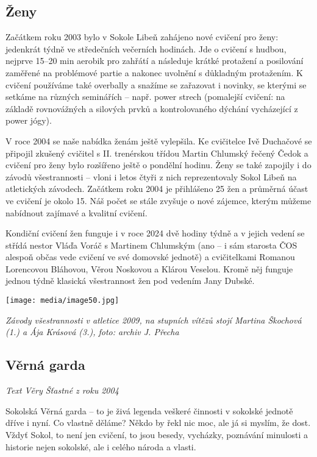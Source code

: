 \subsection{Ženy}\label{ux17eeny}

Začátkem roku 2003 bylo v Sokole Libeň zahájeno nové cvičení pro ženy:
jedenkrát týdně ve středečních večerních hodinách. Jde o cvičení s
hudbou, nejprve 15--20 min aerobik pro zahřátí a následuje krátké
protažení a posilování zaměřené na problémové partie a nakonec uvolnění
s důkladným protažením. K cvičení používáme také overbally a snažíme se
zařazovat i novinky, se kterými se setkáme na různých seminářích --
např. power strech (pomalejší cvičení: na základě rovnovážných a
silových prvků a kontrolovaného dýchání vycházející z power jógy).

V roce 2004 se naše nabídka ženám ještě vylepšila. Ke cvičitelce Ivě
Duchačové se připojil zkušený cvičitel s II. trenérskou třídou Martin
Chlumský řečený Čedok a cvičení pro ženy bylo rozšířeno ještě o pondělní
hodinu. Ženy se také zapojily i do závodů všestrannosti -- vloni i letos
čtyři z nich reprezentovaly Sokol Libeň na atletických závodech.
Začátkem roku 2004 je přihlášeno 25 žen a průměrná účast ve cvičení je
okolo 15. Náš počet se stále zvyšuje o nové zájemce, kterým můžeme
nabídnout zajímavé a kvalitní cvičení.

Kondiční cvičení žen funguje i v roce 2024 dvě hodiny týdně a v jejich
vedení se střídá nestor Vláďa Voráč s Martinem Chlumským (ano -- i sám
starosta ČOS alespoň občas vede cvičení ve své domovské jednotě) a
cvičitelkami Romanou Lorencovou Bláhovou, Věrou Noskovou a Klárou
Veselou. Kromě něj funguje jednou týdně klasická všestrannost žen pod
vedením Jany Dubské.

\texttt{[image: media/image50.jpg]}

\emph{Závody všestrannosti v atletice 2009, na stupních vítězů stojí
Martina Škochová (1.) a Ája Krásová (3.), foto: archiv J. Přecha}

\subsection{Věrná garda}\label{vux11brnuxe1-garda-1}

\emph{Text Věry Šťastné z roku 2004}

Sokolská Věrná garda -- to je živá legenda veškeré činnosti v sokolské
jednotě dříve i nyní. Co vlastně děláme? Někdo by řekl nic moc, ale já
si myslím, že dost. Vždyť Sokol, to není jen cvičení, to jsou besedy,
vycházky, poznávání minulosti a historie nejen sokolské, ale i celého
národa a vlasti.

